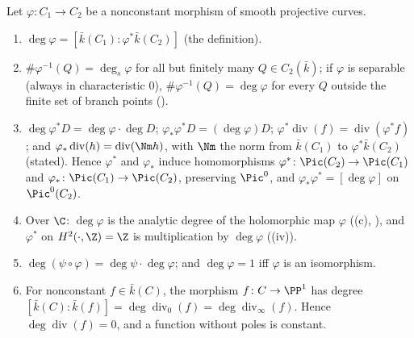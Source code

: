 \begin{corollary}\label{cor:curves:degree-three-ways}
Let $\varphi\colon C_1\to C_2$ be a nonconstant morphism of smooth projective curves.
\begin{enumerate}[label=(\roman*)]
\item $\deg\varphi=[\bar k(C_1):\varphi^*\bar k(C_2)]$ (the definition).
\item $\#\varphi^{-1}(Q)=\deg_s\varphi$ for all but finitely many $Q\in C_2(\bar k)$; if $\varphi$ is separable (always in characteristic $0$), $\#\varphi^{-1}(Q)=\deg\varphi$ for every $Q$
outside the finite set of branch points ().
\item $\deg\varphi^*D=\deg\varphi\cdot\deg D$; $\varphi_*\varphi^*D=(\deg\varphi)D$; $\varphi^*\operatorname{div}(f)=\operatorname{div}(\varphi^*f)$; and $\varphi_*\operatorname{div}(h)=\operatorname{div}(\Nm h)$, with $\Nm$ the norm
from $\bar k(C_1)$ to $\varphi^*\bar k(C_2)$ (stated). Hence $\varphi^*$ and $\varphi_*$ induce homomorphisms $\varphi^*\colon\Pic(C_2)\to\Pic(C_1)$ and $\varphi_*\colon\Pic(C_1)\to\Pic(C_2)$,
preserving $\Pic^0$, and $\varphi_*\varphi^*=[\deg\varphi]$ on $\Pic^0(C_2)$.
\item Over $\C$: $\deg\varphi$ is the analytic degree of the holomorphic map $\varphi$ ((c), ), and
$\varphi^*$ on $H^2(\cdot,\Z)=\Z$ is multiplication by $\deg\varphi$ ((iv)).
\item $\deg(\psi\circ\varphi)=\deg\psi\cdot\deg\varphi$; and $\deg\varphi=1$ iff $\varphi$ is an isomorphism.
\item For nonconstant $f\in\bar k(C)$, the morphism $f\colon C\to\PP^1$ has degree $[\bar k(C):\bar k(f)]=\deg\operatorname{div}_0(f)=\deg\operatorname{div}_\infty(f)$. Hence
$\deg\operatorname{div}(f)=0$, and a function without poles is constant.
\end{enumerate}
\end{corollary}


